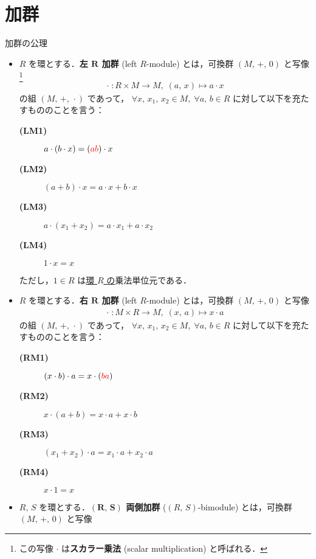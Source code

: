 \documentclass[geometry_main]{subfiles}
\begin{document}
\section{加群}

\begin{myaxiom}[label=ax:module,breakable]{加群の公理}
	\begin{itemize}
		\item $R$ を環とする．\textbf{左 $\bm{R}$ 加群} (left $R$-module) とは，可換群 $(M,\, +,\, 0)$ と写像\footnote{この写像 $\cdot$ は\textbf{スカラー乗法} (scalar multiplication) と呼ばれる．}
		\begin{align}
			\cdot \; \colon R \times M \to M,\; (a,\, x) \mapsto a \cdot x
		\end{align}
		の組 $(M,\, +,\,\cdot\mathrel{})$ であって， $\forall x,\, x_1,\, x_2 \in M,\; \forall a,\, b \in R$ に対して以下を充たすもののことを言う：
		\begin{description}
			\item[\textbf{(LM1)}] $a \cdot (b \cdot x) = (\textcolor{red}{ab}) \cdot x$
			\item[\textbf{(LM2)}] $(a+b) \cdot x = a \cdot x + b \cdot x$
			\item[\textbf{(LM3)}] $a \cdot (x_1 + x_2) = a \cdot x_1 + a\cdot x_2$
			\item[\textbf{(LM4)}] $1 \cdot x = x$
		\end{description}
		ただし，$1 \in R$ は\underline{環 $R$ の}乗法単位元である．
		\item $R$ を環とする．\textbf{右 $\bm{R}$ 加群} (left $R$-module) とは，可換群 $(M,\, +,\, 0)$ と写像
		\begin{align}
			\cdot \; \colon M \times R \to M,\; (x,\, a) \mapsto x \cdot a
		\end{align}
		の組 $(M,\, +,\,\cdot\mathrel{})$ であって， $\forall x,\, x_1,\, x_2 \in M,\; \forall a,\, b \in R$ に対して以下を充たすもののことを言う：
		\begin{description}
			\item[\textbf{(RM1)}] $(x \cdot b) \cdot a = x \cdot (\textcolor{red}{ba})$
			\item[\textbf{(RM2)}] $x \cdot (a+b) = x \cdot a + x \cdot b$
			\item[\textbf{(RM3)}] $(x_1 + x_2) \cdot a = x_1 \cdot a + x_2 \cdot a$
			\item[\textbf{(RM4)}] $x \cdot 1 = x$
		\end{description}
		\item $R,\, S$ を環とする．\textbf{$\bm{(R,\, S)}$ 両側加群} ($(R,\, S)$-bimodule) とは，可換群 $(M,\, +,\, 0)$ と写像

\end{itemize}
\end{myaxiom}
\end{document}

